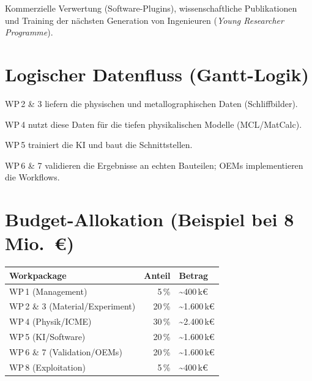 \documentclass[12pt,a4paper]{article}
\begin{document}
Kommerzielle Verwertung (Software-Plugins), wissenschaftliche Publikationen
und Training der nächsten Generation von Ingenieuren (\emph{Young Researcher
Programme}).

\section{Logischer Datenfluss (Gantt-Logik)}

\begin{description}[leftmargin=*]
  \item[Monat 1--12:] WP\,2 \& 3 liefern die physischen und
        metallographischen Daten (Schliffbilder).
  \item[Monat 6--24:] WP\,4 nutzt diese Daten für die tiefen physikalischen
        Modelle (MCL/MatCalc).
  \item[Monat 18--36:] WP\,5 trainiert die KI und baut die Schnittstellen.
  \item[Monat 24--42:] WP\,6 \& 7 validieren die Ergebnisse an echten
        Bauteilen; OEMs implementieren die Workflows.
\end{description}

\section{Budget-Allokation (Beispiel bei 8\,Mio.\ €)}

\begin{tabular}{L{6cm} r l}
  \toprule
  \textbf{Workpackage} & \textbf{Anteil} & \textbf{Betrag} \\
  \midrule
  WP\,1 (Management)                   & 5\,\%  & \~{}400\,k€ \\
  WP\,2 \& 3 (Material/Experiment)     & 20\,\% & \~{}1.600\,k€ \\
  WP\,4 (Physik/ICME)                  & 30\,\% & \~{}2.400\,k€ \\
  WP\,5 (KI/Software)                  & 20\,\% & \~{}1.600\,k€ \\
  WP\,6 \& 7 (Validation/OEMs)         & 20\,\% & \~{}1.600\,k€ \\
  WP\,8 (Exploitation)                 & 5\,\%  & \~{}400\,k€ \\
  \bottomrule
\end{tabular}
\end{document}
